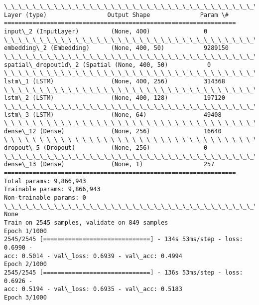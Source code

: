 \documentclass[11pt]{article}
\begin{document}
    \begin{Verbatim}[commandchars=\\\{\}]
\_\_\_\_\_\_\_\_\_\_\_\_\_\_\_\_\_\_\_\_\_\_\_\_\_\_\_\_\_\_\_\_\_\_\_\_\_\_\_\_\_\_\_\_\_\_\_\_\_\_\_\_\_\_\_\_\_\_\_\_\_\_\_\_\_
Layer (type)                 Output Shape              Param \#
=================================================================
input\_2 (InputLayer)         (None, 400)               0
\_\_\_\_\_\_\_\_\_\_\_\_\_\_\_\_\_\_\_\_\_\_\_\_\_\_\_\_\_\_\_\_\_\_\_\_\_\_\_\_\_\_\_\_\_\_\_\_\_\_\_\_\_\_\_\_\_\_\_\_\_\_\_\_\_
embedding\_2 (Embedding)      (None, 400, 50)           9289150
\_\_\_\_\_\_\_\_\_\_\_\_\_\_\_\_\_\_\_\_\_\_\_\_\_\_\_\_\_\_\_\_\_\_\_\_\_\_\_\_\_\_\_\_\_\_\_\_\_\_\_\_\_\_\_\_\_\_\_\_\_\_\_\_\_
spatial\_dropout1d\_2 (Spatial (None, 400, 50)           0
\_\_\_\_\_\_\_\_\_\_\_\_\_\_\_\_\_\_\_\_\_\_\_\_\_\_\_\_\_\_\_\_\_\_\_\_\_\_\_\_\_\_\_\_\_\_\_\_\_\_\_\_\_\_\_\_\_\_\_\_\_\_\_\_\_
lstm\_1 (LSTM)                (None, 400, 256)          314368
\_\_\_\_\_\_\_\_\_\_\_\_\_\_\_\_\_\_\_\_\_\_\_\_\_\_\_\_\_\_\_\_\_\_\_\_\_\_\_\_\_\_\_\_\_\_\_\_\_\_\_\_\_\_\_\_\_\_\_\_\_\_\_\_\_
lstm\_2 (LSTM)                (None, 400, 128)          197120
\_\_\_\_\_\_\_\_\_\_\_\_\_\_\_\_\_\_\_\_\_\_\_\_\_\_\_\_\_\_\_\_\_\_\_\_\_\_\_\_\_\_\_\_\_\_\_\_\_\_\_\_\_\_\_\_\_\_\_\_\_\_\_\_\_
lstm\_3 (LSTM)                (None, 64)                49408
\_\_\_\_\_\_\_\_\_\_\_\_\_\_\_\_\_\_\_\_\_\_\_\_\_\_\_\_\_\_\_\_\_\_\_\_\_\_\_\_\_\_\_\_\_\_\_\_\_\_\_\_\_\_\_\_\_\_\_\_\_\_\_\_\_
dense\_12 (Dense)             (None, 256)               16640
\_\_\_\_\_\_\_\_\_\_\_\_\_\_\_\_\_\_\_\_\_\_\_\_\_\_\_\_\_\_\_\_\_\_\_\_\_\_\_\_\_\_\_\_\_\_\_\_\_\_\_\_\_\_\_\_\_\_\_\_\_\_\_\_\_
dropout\_5 (Dropout)          (None, 256)               0
\_\_\_\_\_\_\_\_\_\_\_\_\_\_\_\_\_\_\_\_\_\_\_\_\_\_\_\_\_\_\_\_\_\_\_\_\_\_\_\_\_\_\_\_\_\_\_\_\_\_\_\_\_\_\_\_\_\_\_\_\_\_\_\_\_
dense\_13 (Dense)             (None, 1)                 257
=================================================================
Total params: 9,866,943
Trainable params: 9,866,943
Non-trainable params: 0
\_\_\_\_\_\_\_\_\_\_\_\_\_\_\_\_\_\_\_\_\_\_\_\_\_\_\_\_\_\_\_\_\_\_\_\_\_\_\_\_\_\_\_\_\_\_\_\_\_\_\_\_\_\_\_\_\_\_\_\_\_\_\_\_\_
None
Train on 2545 samples, validate on 849 samples
Epoch 1/1000
2545/2545 [==============================] - 134s 53ms/step - loss: 0.6990 -
acc: 0.5014 - val\_loss: 0.6939 - val\_acc: 0.4994
Epoch 2/1000
2545/2545 [==============================] - 136s 53ms/step - loss: 0.6926 -
acc: 0.5194 - val\_loss: 0.6935 - val\_acc: 0.5183
Epoch 3/1000

\end{Verbatim}
\end{document}
